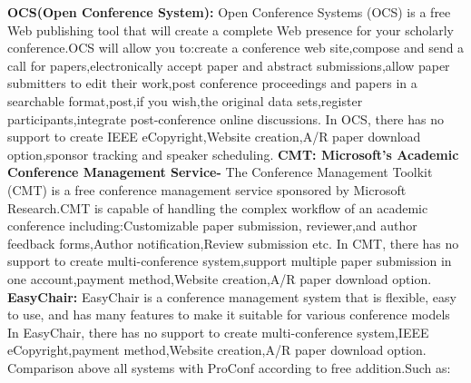 \textbf{OCS(Open Conference System):} Open Conference Systems (OCS) is a free Web publishing tool that will create a complete Web presence for your scholarly conference.OCS will allow you to:create a conference web site,compose and send a call for papers,electronically accept paper and abstract submissions,allow paper submitters to edit their work,post conference proceedings and papers in a searchable format,post,if you wish,the original data sets,register participants,integrate post-conference online discussions.\cite{ref3}\newline
In OCS, there has no support to create IEEE eCopyright,Website creation,A/R paper download option,sponsor tracking and speaker scheduling.\newline
\textbf{CMT: Microsoft’s Academic Conference Management Service-} The Conference Management Toolkit (CMT) is a free conference management service sponsored by Microsoft Research.CMT is capable of handling the complex workflow of an academic conference including:Customizable paper submission, reviewer,and author feedback forms,Author notification,Review submission etc.\cite{ref6}\newline
In CMT, there has no support to create multi-conference system,support multiple paper submission in one account,payment method,Website creation,A/R paper download option.\newline
\textbf{EasyChair:} EasyChair is a conference management system that is flexible, easy to use, and has many features to make it suitable for various conference models\cite{ref4}\newline
In EasyChair, there has no support to create multi-conference system,IEEE eCopyright,payment method,Website creation,A/R paper download option.\newline
Comparison above all systems with ProConf according to free addition.Such as:\newline

